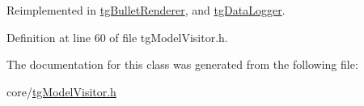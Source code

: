 Reimplemented in \hyperlink{classtg_bullet_renderer_a34cb0f90b210ca46a5f29ce9909d2d23}{tg\-Bullet\-Renderer}, and \hyperlink{classtg_data_logger_a3411a932558d43846b6b991d52b1afdf}{tg\-Data\-Logger}.



Definition at line 60 of file tg\-Model\-Visitor.\-h.



The documentation for this class was generated from the following file\-:\begin{DoxyCompactItemize}
\item 
core/\hyperlink{tg_model_visitor_8h}{tg\-Model\-Visitor.\-h}\end{DoxyCompactItemize}

